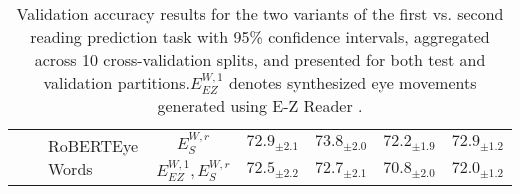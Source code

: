 \begin{table*}[ht]
{\begin{tabular}{lllccccc}
\cmidrule{3-8} 
 & & \multirow{2}{*}{RoBERTEye Words} & $E_S^{W,r}$ & $72.9_{\pm2.1}$ & $73.8_{\pm2.0}$ & $72.2_{\pm1.9}$ & $72.9_{\pm1.2}$ \\[1ex]
 & &  & $E_{EZ}^{W,1}, E_S^{W,r}$ & $72.5_{\pm2.2}$ & $72.7_{\pm2.1}$ & $70.8_{\pm2.0}$ & $72.0_{\pm1.2}$ \\ 
\bottomrule
\end{tabular}
}
\caption{Validation accuracy results for the two variants of the first vs. second reading prediction task with 95\% confidence intervals, aggregated across 10 cross-validation splits, and presented for both test and validation partitions.$E_{EZ}^{W,1}$ denotes synthesized eye movements generated using \mbox{E-Z} Reader \cite{reichle2003ez}.}
\label{app:tab:val_accuracy}
\end{table*}


